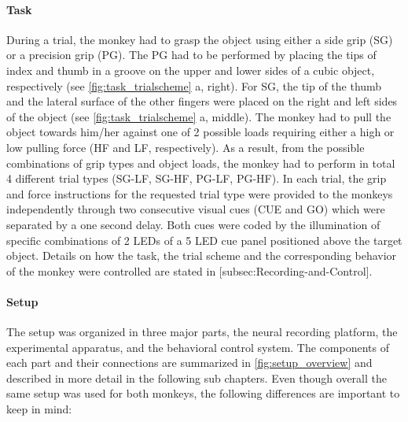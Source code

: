 {\paragraph{Task}

During a trial, the monkey had to grasp the object using either a side grip (SG) or a precision grip (PG). The PG had to be performed by placing the tips of index and thumb in a groove on the upper and lower sides of a cubic object, respectively (see \cref{fig:task_trialscheme} a, right). For SG, the tip of the thumb and the lateral surface of the other fingers were placed on the right and left sides of the object (see \cref{fig:task_trialscheme} a, middle). The monkey had to pull the object towards him/her against one of 2 possible loads requiring either a high or low pulling force (HF and LF, respectively). As a result, from the possible combinations of grip types and object loads, the monkey had to perform in total 4 different trial types (SG-LF, SG-HF, PG-LF, PG-HF). In each trial, the grip and force instructions for the requested trial type were provided to the monkeys independently through two consecutive visual cues (CUE and GO) which were separated by a one second delay. Both cues were coded by the illumination of specific combinations of 2 LEDs of a 5 LED cue panel positioned above the target object. Details on how the task, the trial scheme and the corresponding behavior of the monkey were controlled are stated in [subsec:Recording-and-Control].

\paragraph{Setup}

The setup was organized in three major parts, the neural recording platform, the experimental apparatus, and the behavioral control system. The components of each part and their connections are summarized in \cref{fig:setup_overview} and described in more detail in the following sub chapters. Even though overall the same setup was used for both monkeys, the following differences are important to keep in mind: 

}
